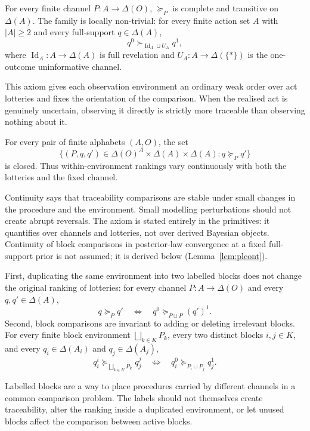 \documentclass[11pt,a4paper]{article}
\theoremstyle{definition}
\newcommand{\Id}{\operatorname{Id}}
\newcommand{\1}{\mathbf 1}
\begin{document}
\begin{description}[leftmargin=*,style=sameline]

\item[(A1) Weak order and local non-triviality.]
For every finite channel $P:A\to\Delta(O)$, $\succeq_P$ is complete and transitive on $\Delta(A)$.  The family is
locally non-trivial: for every finite action set $A$ with $|A|\ge 2$ and every full-support $q\in\Delta(A)$,
\[
q^0\succ_{\Id_A\sqcup U_A}q^1,
\]
where $\Id_A:A\to\Delta(A)$ is full revelation and $U_A:A\to\Delta(\{\ast\})$ is the one-outcome uninformative channel.

This axiom gives each observation environment an ordinary weak order over act lotteries and fixes the orientation of the
comparison.  When the realised act is genuinely uncertain, observing it directly is strictly more traceable than observing
nothing about it.

\item[(A2) Continuity.]
For every pair of finite alphabets $(A,O)$, the set
\[
\{(P,q,q')\in \Delta(O)^A\times\Delta(A)\times\Delta(A):q\succeq_P q'\}
\]
is closed.  Thus within-environment rankings vary continuously with both the lotteries and the fixed channel.

Continuity says that traceability comparisons are stable under small changes in the procedure and the environment.  Small
modelling perturbations should not create abrupt reversals.  The axiom is stated entirely in the primitives: it quantifies
over channels and lotteries, not over derived Bayesian objects.  Continuity of block comparisons in posterior-law
convergence at a fixed full-support prior is not assumed; it is derived below
(Lemma~\ref{lem:plcont}).

\item[(A3) Block-comparison coherence.]
First, duplicating the same environment into two labelled blocks does not change the original ranking of lotteries:
for every channel $P:A\to\Delta(O)$ and every $q,q'\in\Delta(A)$,
\[
q\succeq_P q'
\quad\Longleftrightarrow\quad
q^0\succeq_{P\sqcup P}(q')^1.
\]
Second, block comparisons are invariant to adding or deleting irrelevant blocks.  For every finite block environment
$\bigsqcup_{k\in K}P_k$, every two distinct blocks $i,j\in K$, and every
$q_i\in\Delta(A_i)$ and $q_j\in\Delta(A_j)$,
\[
q_i^i\succeq_{\bigsqcup_{k\in K}P_k}q_j^j
\quad\Longleftrightarrow\quad
q_i^0\succeq_{P_i\sqcup P_j}q_j^1.
\]

Labelled blocks are a way to place procedures carried by different channels in a common comparison problem.  The labels
should not themselves create traceability, alter the ranking inside a duplicated environment, or let unused blocks affect
the comparison between active blocks.


\end{description}
\end{document}
